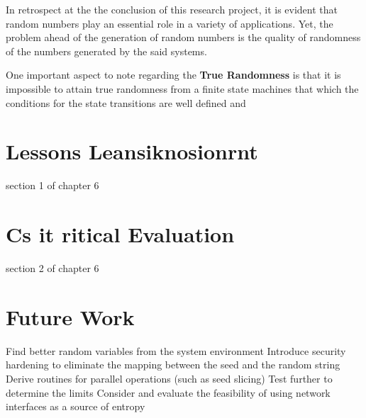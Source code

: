In retrospect at the the conclusion of this research project, it is evident that random numbers play an essential role in a variety of applications. Yet, the problem ahead of the generation of random numbers is the quality of randomness of the numbers generated by the said systems.

One important aspect to note regarding the \textbf{True Randomness} is that it is impossible to attain true randomness from a finite state machines that which the conditions for the state transitions are well defined and 
\section{Lessons Leansiknosionrnt}
section 1 of chapter 6
\section{Cs it ritical Evaluation}
section 2 of chapter 6
\section{Future Work}
Find better random variables from the system environment
Introduce security hardening to eliminate the mapping between the seed and the random string
Derive routines for parallel operations (such as seed slicing)
Test further to determine the limits
Consider and evaluate the feasibility of using network interfaces as a source of entropy